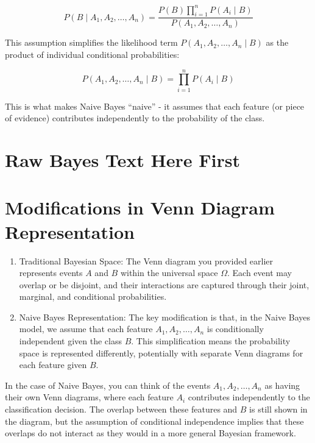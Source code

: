 \documentclass[
  12 pt,
  a4paper,
]{book}
\providecommand{\tightlist}{%
  \setlength{\itemsep}{0pt}\setlength{\parskip}{0pt}}
\numberwithin{equation}{section}
\theoremstyle{plain}      %
\theoremstyle{definition} %
\theoremstyle{remark}     %
\theoremstyle{note}         %
\begin{document}
\[
P\left(B \mid A_1, A_2, \ldots, A_n\right)=\frac{P(B) \prod_{i=1}^n P\left(A_i \mid B\right)}{P\left(A_1, A_2, \ldots, A_n\right)}
\]

This assumption simplifies the likelihood term
\(P\left(A_1, A_2, \ldots, A_n \mid B\right)\) as the product of
individual conditional probabilities:

\[
P\left(A_1, A_2, \ldots, A_n \mid B\right)=\prod_{i=1}^n P\left(A_i \mid B\right)
\]

This is what makes Naive Bayes ``naive'' - it assumes that each feature
(or piece of evidence) contributes independently to the probability of
the class.

\newpage

\hypertarget{raw-bayes-text-here-first}{%
\section{Raw Bayes Text Here First}\label{raw-bayes-text-here-first}}

\newpage

\hypertarget{modifications-in-venn-diagram-representation}{%
\section{Modifications in Venn Diagram
Representation}\label{modifications-in-venn-diagram-representation}}

\begin{enumerate}
\def\labelenumi{\arabic{enumi}.}
\tightlist
\item
  Traditional Bayesian Space: The Venn diagram you provided earlier
  represents events \(A\) and \(B\) within the universal space
  \(\Omega\). Each event may overlap or be disjoint, and their
  interactions are captured through their joint, marginal, and
  conditional probabilities.
\item
  Naive Bayes Representation: The key modification is that, in the Naive
  Bayes model, we assume that each feature \(A_1, A_2, \ldots, A_n\) is
  conditionally independent given the class \(B\). This simplification
  means the probability space is represented differently, potentially
  with separate Venn diagrams for each feature given \(B\).
\end{enumerate}

In the case of Naive Bayes, you can think of the events
\(A_1, A_2, \ldots, A_n\) as having their own Venn diagrams, where each
feature \(A_i\) contributes independently to the classification
decision. The overlap between these features and \(B\) is still shown in
the diagram, but the assumption of conditional independence implies that
these overlaps do not interact as they would in a more general Bayesian
framework.
\end{document}
